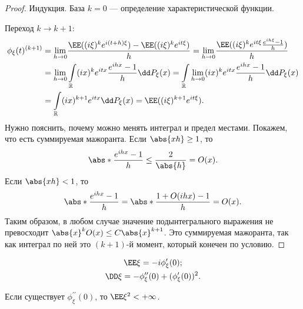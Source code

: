  \begin{proof}
     Индукция. База $k = 0$ --- определение характеристической функции.

     Переход $k\rightarrow k + 1$:
    \begin{align*}
        \phi_\xi(t)^{(k+ 1)} &= \underset{h\rightarrow 0}{\lim} \frac{\EE ((i\xi)^ke^{i(t+h)\xi}) - \EE ((i\xi)^ke^{it\xi})}{h} =
         \underset{h\rightarrow 0}{\lim} \frac{\EE ((i\xi)^ke^{it\xi}\frac{e^{ih\xi} - 1}{h})}{h} \\&=
         \underset{h\rightarrow 0}{\lim} \int\limits_\mathbb{R} (ix)^ke^{itx}\frac{e^{ihx} - 1}{h}\dd P_\xi(x) =
         \int\limits_\mathbb{R}  \underset{h\rightarrow 0}{\lim}  (ix)^ke^{itx}\frac{e^{ihx} - 1}{h}\dd P_\xi(x) \\&=
         \int\limits_\mathbb{R} (ix)^{k + 1}e^{itx}\dd P_\xi(x) = \EE ((i\xi)^{k+1}e^{it\xi}).
    \end{align*}
    Нужно пояснить, почему можно менять интеграл и предел местами. Покажем, что есть суммируемая мажоранта.
    Если $\abs{xh}\ge 1$, то
    $$ \abs*{\frac{e^{ihx} - 1}{h}}\le \frac{2}{\abs{h}} = O(x).$$
Если $\abs{xh}< 1$, то
$$\abs*{\frac{e^{ihx} - 1}{h}} = \abs*{\frac{1 + O(ihx) - 1}{h}} = O(x).$$
Таким образом, в любом случае значение подынтегрального выражения не превосходит $\abs{x}^kO(x) \le C\abs{x}^{k + 1}$. Это суммируемая мажоранта, так как интеграл по ней это $(k + 1)$-й момент, который конечен по условию.
 \end{proof}

 \begin{corollary}
 \begin{gather*}
     \EE \xi = -i\phi_\xi^\prime(0);\\
     \DD\xi = -\phi_\xi^{\prime \prime}(0) + (\phi_\xi^\prime(0))^2.
 \end{gather*}
     \end{corollary}


 \begin{theorem}
     Если существует $\phi_\xi^{\prime \prime}(0)$, то $\EE \xi^2 < + \infty$.
 \end{theorem}

